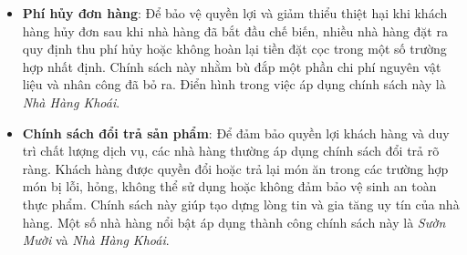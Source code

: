 \begin{itemize}
	\item \textbf{Phí hủy đơn hàng}: Để bảo vệ quyền lợi và giảm thiểu thiệt hại khi khách hàng hủy đơn sau khi nhà hàng đã bắt đầu chế biến, nhiều nhà hàng đặt ra quy định thu phí hủy hoặc không hoàn lại tiền đặt cọc trong một số trường hợp nhất định. Chính sách này nhằm bù đắp một phần chi phí nguyên vật liệu và nhân công đã bỏ ra. Điển hình trong việc áp dụng chính sách này là \textit{Nhà Hàng Khoái}.

	\item \textbf{Chính sách đổi trả sản phẩm}: Để đảm bảo quyền lợi khách hàng và duy trì chất lượng dịch vụ, các nhà hàng thường áp dụng chính sách đổi trả rõ ràng. Khách hàng được quyền đổi hoặc trả lại món ăn trong các trường hợp món bị lỗi, hỏng, không thể sử dụng hoặc không đảm bảo vệ sinh an toàn thực phẩm. Chính sách này giúp tạo dựng lòng tin và gia tăng uy tín của nhà hàng. Một số nhà hàng nổi bật áp dụng thành công chính sách này là \textit{Sườn Mười} và \textit{Nhà Hàng Khoái}.

\end{itemize}



